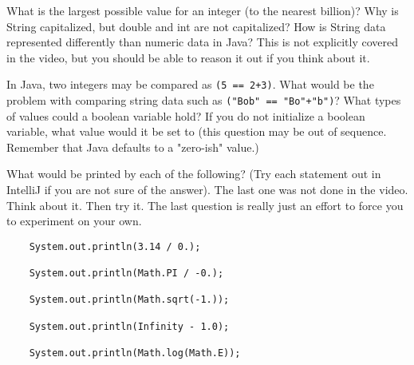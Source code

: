 \documentclass[letter,11pt]{exam}
\begin{document}
\begin{questions}
\question What is the largest possible value for an integer (to the nearest billion)?
\question Why is String capitalized, but double and int are not capitalized?
\question How is String data represented differently than numeric data in Java?
\vspace{1cm}
\question This is not explicitly covered in the video, but you should be able to reason it out if you think about it.  

In Java, two integers may be compared as \texttt{(5 == 2+3)}.  What would be the problem with comparing string data such as \texttt{("Bob" == "Bo"+"b")}?
\vspace{1cm}
\question What types of values could a boolean variable hold?
\question If you do not initialize a boolean variable, what value would it be set to (this question may be out of sequence.  Remember that Java defaults to a "zero-ish" value.)
\begin{samepage}
\question What would be printed by each of the following?  (Try each statement out in IntelliJ if you are not sure of the answer).  The last one was not done in the video.  Think about it.  Then try it.  The last question is really just an effort to force you to experiment on your own.
\begin{verbatim}
    System.out.println(3.14 / 0.);

    System.out.println(Math.PI / -0.);
    
    System.out.println(Math.sqrt(-1.));
    
    System.out.println(Infinity - 1.0);

    System.out.println(Math.log(Math.E)); 
\end{verbatim}
\end{samepage}


\end{questions}
\end{document}
